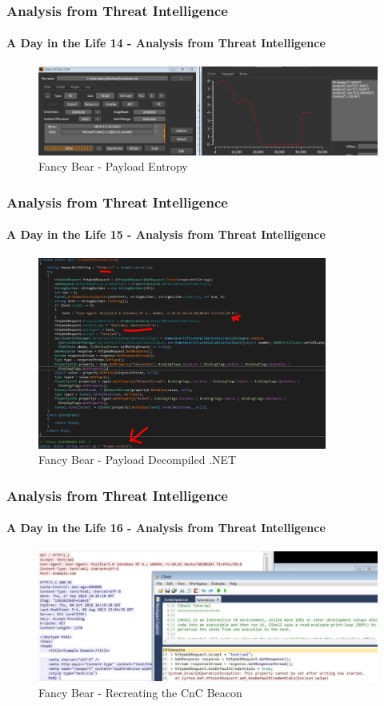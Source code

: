 \documentclass[aspectratio=169]{beamer}
\begin{document}
\begin{frame}
  \frametitle{Analysis from Threat Intelligence}
  \framesubtitle{A Day in the Life 14 - Analysis from Threat Intelligence}
  \begin{center}
    \begin{figure}
      \includegraphics[width=14cm,keepaspectratio]{fancy_bear_analysis_6}
      \caption{Fancy Bear - Payload Entropy}
    \end{figure}
  \end{center}
\end{frame}

\begin{frame}
  \frametitle{Analysis from Threat Intelligence}
  \framesubtitle{A Day in the Life 15 - Analysis from Threat Intelligence}
  \begin{center}
    \begin{figure}
      \includegraphics[width=9.5cm,keepaspectratio]{fancy_bear_analysis_7}
      \caption{Fancy Bear - Payload Decompiled .NET}
    \end{figure}
  \end{center}
\end{frame}

\begin{frame}
  \frametitle{Analysis from Threat Intelligence}
  \framesubtitle{A Day in the Life 16 - Analysis from Threat Intelligence}
  \begin{center}
    \begin{figure}
      \includegraphics[width=14cm,keepaspectratio]{fancy_bear_analysis_8}
      \caption{Fancy Bear - Recreating the CnC Beacon}
    \end{figure}
  \end{center}
\end{frame}
\end{document}
